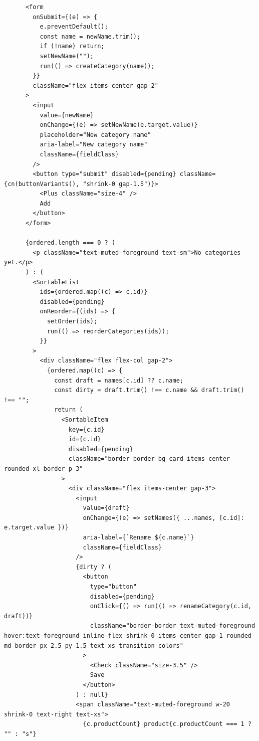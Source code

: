 \documentclass[11pt,a4paper]{article}
\begin{document}
\begin{lstlisting}
      <form
        onSubmit={(e) => {
          e.preventDefault();
          const name = newName.trim();
          if (!name) return;
          setNewName("");
          run(() => createCategory(name));
        }}
        className="flex items-center gap-2"
      >
        <input
          value={newName}
          onChange={(e) => setNewName(e.target.value)}
          placeholder="New category name"
          aria-label="New category name"
          className={fieldClass}
        />
        <button type="submit" disabled={pending} className={cn(buttonVariants(), "shrink-0 gap-1.5")}>
          <Plus className="size-4" />
          Add
        </button>
      </form>

      {ordered.length === 0 ? (
        <p className="text-muted-foreground text-sm">No categories yet.</p>
      ) : (
        <SortableList
          ids={ordered.map((c) => c.id)}
          disabled={pending}
          onReorder={(ids) => {
            setOrder(ids);
            run(() => reorderCategories(ids));
          }}
        >
          <div className="flex flex-col gap-2">
            {ordered.map((c) => {
              const draft = names[c.id] ?? c.name;
              const dirty = draft.trim() !== c.name && draft.trim() !== "";
              return (
                <SortableItem
                  key={c.id}
                  id={c.id}
                  disabled={pending}
                  className="border-border bg-card items-center rounded-xl border p-3"
                >
                  <div className="flex items-center gap-3">
                    <input
                      value={draft}
                      onChange={(e) => setNames({ ...names, [c.id]: e.target.value })}
                      aria-label={`Rename ${c.name}`}
                      className={fieldClass}
                    />
                    {dirty ? (
                      <button
                        type="button"
                        disabled={pending}
                        onClick={() => run(() => renameCategory(c.id, draft))}
                        className="border-border text-muted-foreground hover:text-foreground inline-flex shrink-0 items-center gap-1 rounded-md border px-2.5 py-1.5 text-xs transition-colors"
                      >
                        <Check className="size-3.5" />
                        Save
                      </button>
                    ) : null}
                    <span className="text-muted-foreground w-20 shrink-0 text-right text-xs">
                      {c.productCount} product{c.productCount === 1 ? "" : "s"}

\end{lstlisting}
\end{document}
